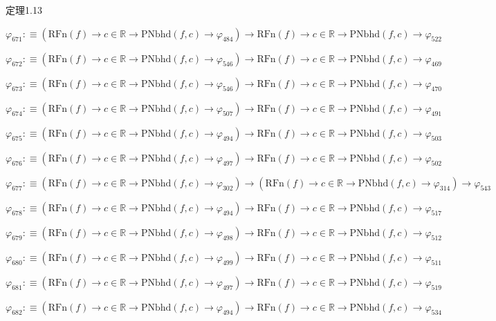 \begin{fullproof}{定理1.13}
\begin{abbrevlist}
\item $\varphi_{671} :\equiv (\mathrm{RFn}(f) \to c \in \mathbb{R} \to \mathrm{PNbhd}(f,c) \to \varphi_{484}) \to \mathrm{RFn}(f) \to c \in \mathbb{R} \to \mathrm{PNbhd}(f,c) \to \varphi_{522}$
\item $\varphi_{672} :\equiv (\mathrm{RFn}(f) \to c \in \mathbb{R} \to \mathrm{PNbhd}(f,c) \to \varphi_{546}) \to \mathrm{RFn}(f) \to c \in \mathbb{R} \to \mathrm{PNbhd}(f,c) \to \varphi_{469}$
\item $\varphi_{673} :\equiv (\mathrm{RFn}(f) \to c \in \mathbb{R} \to \mathrm{PNbhd}(f,c) \to \varphi_{546}) \to \mathrm{RFn}(f) \to c \in \mathbb{R} \to \mathrm{PNbhd}(f,c) \to \varphi_{470}$
\item $\varphi_{674} :\equiv (\mathrm{RFn}(f) \to c \in \mathbb{R} \to \mathrm{PNbhd}(f,c) \to \varphi_{507}) \to \mathrm{RFn}(f) \to c \in \mathbb{R} \to \mathrm{PNbhd}(f,c) \to \varphi_{491}$
\item $\varphi_{675} :\equiv (\mathrm{RFn}(f) \to c \in \mathbb{R} \to \mathrm{PNbhd}(f,c) \to \varphi_{494}) \to \mathrm{RFn}(f) \to c \in \mathbb{R} \to \mathrm{PNbhd}(f,c) \to \varphi_{503}$
\item $\varphi_{676} :\equiv (\mathrm{RFn}(f) \to c \in \mathbb{R} \to \mathrm{PNbhd}(f,c) \to \varphi_{497}) \to \mathrm{RFn}(f) \to c \in \mathbb{R} \to \mathrm{PNbhd}(f,c) \to \varphi_{502}$
\item $\varphi_{677} :\equiv (\mathrm{RFn}(f) \to c \in \mathbb{R} \to \mathrm{PNbhd}(f,c) \to \varphi_{302}) \to (\mathrm{RFn}(f) \to c \in \mathbb{R} \to \mathrm{PNbhd}(f,c) \to \varphi_{314}) \to \varphi_{543}$
\item $\varphi_{678} :\equiv (\mathrm{RFn}(f) \to c \in \mathbb{R} \to \mathrm{PNbhd}(f,c) \to \varphi_{494}) \to \mathrm{RFn}(f) \to c \in \mathbb{R} \to \mathrm{PNbhd}(f,c) \to \varphi_{517}$
\item $\varphi_{679} :\equiv (\mathrm{RFn}(f) \to c \in \mathbb{R} \to \mathrm{PNbhd}(f,c) \to \varphi_{498}) \to \mathrm{RFn}(f) \to c \in \mathbb{R} \to \mathrm{PNbhd}(f,c) \to \varphi_{512}$
\item $\varphi_{680} :\equiv (\mathrm{RFn}(f) \to c \in \mathbb{R} \to \mathrm{PNbhd}(f,c) \to \varphi_{499}) \to \mathrm{RFn}(f) \to c \in \mathbb{R} \to \mathrm{PNbhd}(f,c) \to \varphi_{511}$
\item $\varphi_{681} :\equiv (\mathrm{RFn}(f) \to c \in \mathbb{R} \to \mathrm{PNbhd}(f,c) \to \varphi_{497}) \to \mathrm{RFn}(f) \to c \in \mathbb{R} \to \mathrm{PNbhd}(f,c) \to \varphi_{519}$
\item $\varphi_{682} :\equiv (\mathrm{RFn}(f) \to c \in \mathbb{R} \to \mathrm{PNbhd}(f,c) \to \varphi_{494}) \to \mathrm{RFn}(f) \to c \in \mathbb{R} \to \mathrm{PNbhd}(f,c) \to \varphi_{534}$

\end{abbrevlist}
\end{fullproof}
